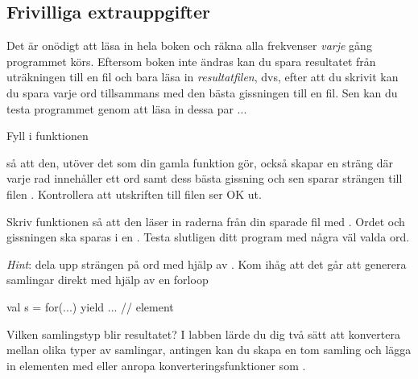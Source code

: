 \subsection{Frivilliga extrauppgifter}
Det är onödigt att läsa in hela boken och räkna alla frekvenser \emph{varje} gång programmet körs. Eftersom boken inte ändras kan du spara resultatet från uträkningen till en fil och bara läsa in \emph{resultatfilen}, dvs, efter att du skrivit  kan du spara varje ord tillsammans med den bästa gissningen till en fil. Sen kan du testa programmet genom att läsa in dessa par ...

\Subtask Fyll i funktionen 
\begin{CodeSmall}
def readBook(bookFile: String, saveToFile: String)} 
\end{CodeSmall}
så att den, utöver det som din gamla funktion gör, också skapar en sträng där varje rad innehåller ett ord samt dess bästa gissning och sen sparar strängen till filen . Kontrollera att utskriften till filen ser OK ut. 

\Subtask Skriv funktionen  så att den läser in raderna från din sparade fil med . Ordet och gissningen ska sparas i en .  Testa slutligen ditt program med några väl valda ord.

\emph{Hint}: dela upp strängen på ord med hjälp av . Kom ihåg att det går att generera samlingar direkt med hjälp av en forloop \begin{CodeSmall}
val s = for(...) yield{
...
// element
}

\end{CodeSmall} 
Vilken samlingstyp blir resultatet? I labben lärde du dig två sätt att konvertera mellan olika typer av samlingar, antingen kan du skapa en tom samling  och lägga in elementen med \code{++} eller anropa konverteringsfunktioner som . 
 


    
